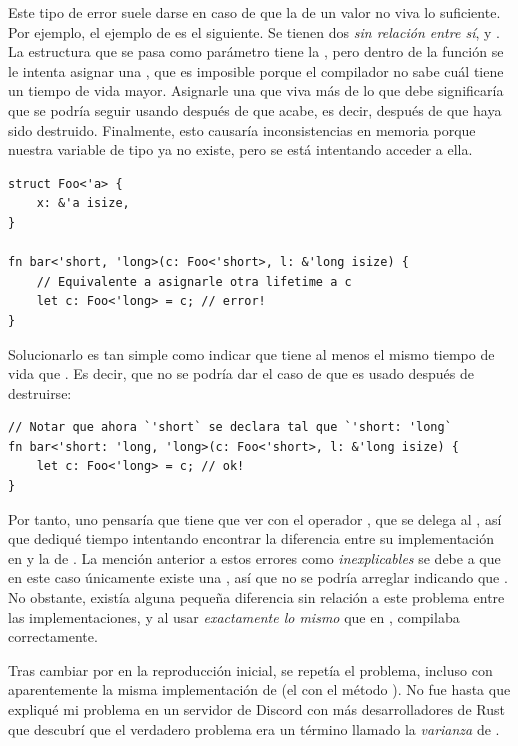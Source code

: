 Este tipo de error suele darse en caso de que la \lifetime de un valor no viva
lo suficiente. Por ejemplo, el ejemplo de  es el
siguiente. Se tienen dos \lifetimes \emph{sin relación entre sí}, 
y . La estructura  que se pasa como parámetro tiene la
\lifetime {}, pero dentro de la función se le intenta asignar una
\lifetime {}, que es imposible porque el compilador no sabe cuál tiene
un tiempo de vida mayor. Asignarle una \lifetime que viva más de lo que debe
significaría que se podría seguir usando  después de que 
acabe, es decir, después de que  haya sido destruido. Finalmente, esto
causaría inconsistencias en memoria porque nuestra variable de tipo 
ya no existe, pero se está intentando acceder a ella.

\begin{verbatim}
struct Foo<'a> {
    x: &'a isize,
}

fn bar<'short, 'long>(c: Foo<'short>, l: &'long isize) {
    // Equivalente a asignarle otra lifetime a c
    let c: Foo<'long> = c; // error!
}
\end{verbatim}

Solucionarlo es tan simple como indicar que  tiene al menos el
mismo tiempo de vida que . Es decir, que no se podría dar el caso de
que  es usado después de destruirse:

\begin{verbatim}
// Notar que ahora `'short` se declara tal que `'short: 'long`
fn bar<'short: 'long, 'long>(c: Foo<'short>, l: &'long isize) {
    let c: Foo<'long> = c; // ok!
}
\end{verbatim}

Por tanto, uno pensaría que tiene que ver con el operador \rust{==}, que se
delega al \trait {}, así que dediqué tiempo intentando encontrar
la diferencia entre su implementación en  y la de
. La mención anterior a estos errores como
\emph{inexplicables} se debe a que en este caso únicamente existe una \lifetime
{}, así que no se podría arreglar indicando que . No
obstante, existía alguna pequeña diferencia sin relación a este problema entre
las implementaciones, y al usar \emph{exactamente lo mismo} que en , compilaba correctamente.

Tras cambiar  por  en la reproducción
inicial, se repetía el problema, incluso con aparentemente la misma
implementación de  (el \trait con el método ). No fue hasta
que expliqué mi problema en un servidor de Discord con más desarrolladores de
Rust que descubrí que el verdadero problema era un término llamado la
\emph{varianza} de .

